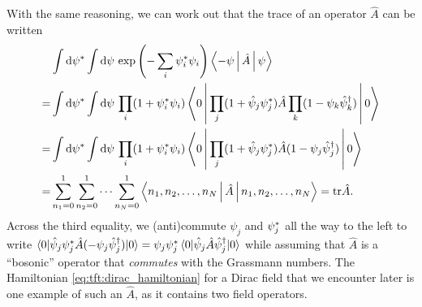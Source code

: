 With the same reasoning, we can work out that the trace of an operator $\hat{A}$ can be written
\begin{equation}
\begin{split}
	 & \int \mathop{}\!\mathrm{d} {\psi}^* \int \mathop{}\!\mathrm{d} \psi \, \exp \left( -\sum_i {\psi}^*_i \psi_i \right) \Braket{-\psi | \hat{A} | \psi} \\
	=& \int \mathop{}\!\mathrm{d} {\psi}^* \int \mathop{}\!\mathrm{d} \psi \, \prod_i (1 + {\psi}^*_i \psi_i) \Braket{0 | \prod_j (1 + \hat\psi_j {\psi}^*_j) \hat{A} \prod_k (1 - \psi_k \hat\psi^\dagger_k) | 0} \\
	=& \int \mathop{}\!\mathrm{d} {\psi}^* \int \mathop{}\!\mathrm{d} \psi \, \prod_i (1 + {\psi}^*_i \psi_i) \Braket{0 | \prod_j (1 + \hat\psi_j {\psi}^*_j) \hat{A} (1 - \psi_j \hat\psi^\dagger_j) | 0} \\
	=& \sum_{n_1=0}^1 \sum_{n_2=0}^1\cdots \sum_{n_N=0}^1 \Braket{n_1, n_2, \ldots, n_N | \hat{A} | n_1, n_2, \ldots, n_N} = \text{tr} \hat{A} . \\
\end{split}
\label{eq:tft:trace_grassmann_discrete}
\end{equation}
Across the third equality, we (anti)commute $\psi_j$ and ${\psi}^*_j$ all the way to the left to write $\braket{0 | \hat\psi_j {\psi}^*_j \hat{A} (-\psi_j \hat\psi^\dagger_j) | 0} = \psi_j {\psi}^*_j \braket{0 | \hat\psi_j \hat{A} \hat\psi^\dagger_j | 0}$ while assuming that $\hat{A}$ is a ``bosonic'' operator that \emph{commutes} with the Grassmann numbers.
The Hamiltonian \eqref{eq:tft:dirac_hamiltonian} for a Dirac field that we encounter later is one example of such an $\hat{A}$, as it contains two field operators.


